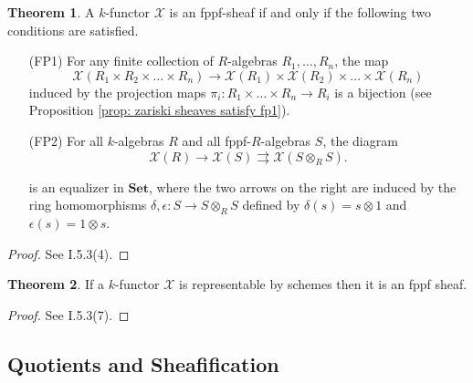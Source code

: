 \documentclass[oneside,11pt]{amsart}
\newcommand{\bSet}{\ensuremath{\textbf{Set}}}
\newcommand{\mX}{\ensuremath{\mathcal{X}}}
\theoremstyle{definition}
\newtheorem{proof techniques}{Proof Techniques}
\newtheorem{theorem}{Theorem}
\begin{document}
\begin{theorem}\label{thm: fppf sheaf characterization}
A $k$-functor $\mX$ is an fppf-sheaf if and only if the following two conditions are satisfied.
\begin{itemize}

\item[(FP1)] For any finite collection of $R$-algebras $R_1, \ldots, R_n$, the map 
\begin{equation*}
\mX(R_1 \times R_2 \times \ldots \times R_n) \to \mX(R_1) \times \mX(R_2) \times \ldots \times \mX(R_n)
\end{equation*}
induced by the projection maps $\pi_i : R_1 \times \ldots \times R_n \to R_i$ is a bijection (see Proposition \ref{prop: zariski sheaves satisfy fp1}). 

\item[(FP2)] For all $k$-algebras $R$ and all fppf-$R$-algebras $S$, the diagram
\begin{equation*}
\mX( R ) \to \mX(S) \rightrightarrows \mX(S \otimes_R S).
\end{equation*}

 is an equalizer in $\bSet$, where the two arrows on the right are induced by the ring homomorphisms $\delta , \epsilon : S \to S \otimes_R S$ defined by $\delta(s) =  s \otimes 1$ and $\epsilon(s) =  1 \otimes s$. 

\end{itemize}
\end{theorem}

\begin{proof}
See \cite{jantzen2003} I.5.3(4).
\end{proof}



\begin{theorem} \label{thm: representable by schemes implies fppf sheaf}
If a $k$-functor $\mX$ is representable by schemes then it is an fppf sheaf. 
\end{theorem}

\begin{proof}
See \cite{jantzen2003} I.5.3(7).
\end{proof}


\subsection{Quotients and Sheafification}
\end{document}
